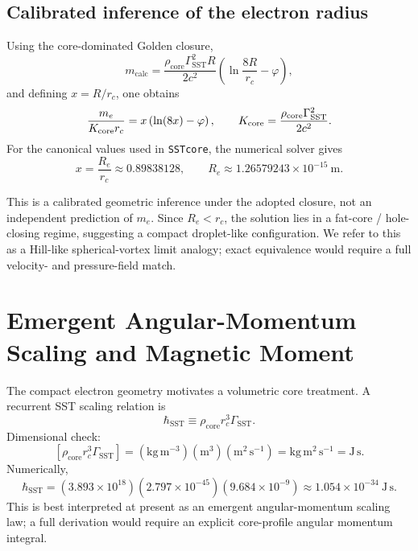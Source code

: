 \documentclass[11pt]{article}
\newcommand{\rc}{r_c}                                    %
\begin{document}
    \subsection{Calibrated inference of the electron radius}
        Using the core-dominated Golden closure,
        \begin{equation}
            m_{\text{calc}} = \frac{\rho_{\text{core}} \Gamma_{\text{SST}}^2 R}{2 c^2}
            \left( \ln \frac{8R}{\rc} - \varphi \right),
            \label{eq:mcalc-golden}
        \end{equation}
        and defining \(x=R/\rc\), one obtains
        \begin{equation}
            \frac{m_e}{K_{\rm core}\rc}
            =
            x\left(\ln(8x)-\varphi\right),
            \qquad
            K_{\rm core}=\frac{\rho_{\text{core}}\Gamma_{\text{SST}}^2}{2c^2}.
        \end{equation}
        For the canonical values used in \texttt{SSTcore}, the numerical solver gives
        \begin{equation}
            x=\frac{R_e}{\rc}\approx 0.89838128,
            \qquad
            R_e\approx 1.26579243\times 10^{-15}\ \mathrm{m}.
        \end{equation}
        
        This is a calibrated geometric inference under the adopted closure, not an independent prediction of \(m_e\). Since \(R_e<\rc\), the solution lies in a fat-core / hole-closing regime, suggesting a compact droplet-like configuration. We refer to this as a Hill-like spherical-vortex limit analogy; exact equivalence would require a full velocity- and pressure-field match.

    \section{Emergent Angular-Momentum Scaling and Magnetic Moment}
    \label{sec:spin_magnetic}
    
    The compact electron geometry motivates a volumetric core treatment. A recurrent SST scaling relation is
    \begin{equation}
        \hbar_{\text{SST}} \equiv \rho_{\text{core}} \rc^3 \Gamma_{\text{SST}}.
        \label{eq:hbar-sst}
    \end{equation}
    Dimensional check:
    \[
        [\rho_{\text{core}}\rc^3\Gamma_{\text{SST}}]
        =
        (\mathrm{kg\,m^{-3}})(\mathrm{m^3})(\mathrm{m^2\,s^{-1}})
        =
        \mathrm{kg\,m^2\,s^{-1}}
        =
        \mathrm{J\,s}.
    \]
    Numerically,
    \begin{equation}
        \hbar_{\text{SST}}
        =
        (3.893\times 10^{18})(2.797\times 10^{-45})(9.684\times 10^{-9})
        \approx 1.054\times 10^{-34}\ \mathrm{J\,s}.
    \end{equation}
    This is best interpreted at present as an emergent angular-momentum scaling law; a full derivation would require an explicit core-profile angular momentum integral.
    
\end{document}
